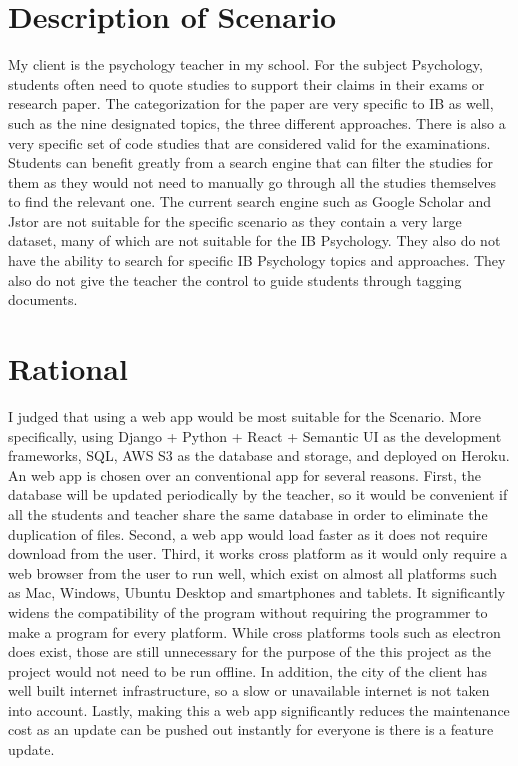 \documentclass[
]{article}
\author{}
\date{}
\begin{document}
\hypertarget{description-of-scenario}{%
\section{Description of Scenario}\label{description-of-scenario}}

My client is the psychology teacher in my school. For the subject
Psychology, students often need to quote studies to support their claims
in their exams or research paper. The categorization for the paper are
very specific to IB as well, such as the nine designated topics, the
three different approaches. There is also a very specific set of code
studies that are considered valid for the examinations. Students can
benefit greatly from a search engine that can filter the studies for
them as they would not need to manually go through all the studies
themselves to find the relevant one. The current search engine such as
Google Scholar and Jstor are not suitable for the specific scenario as
they contain a very large dataset, many of which are not suitable for
the IB Psychology. They also do not have the ability to search for
specific IB Psychology topics and approaches. They also do not give the
teacher the control to guide students through tagging documents.

\hypertarget{rational}{%
\section{Rational}\label{rational}}

I judged that using a web app would be most suitable for the Scenario.
More specifically, using Django + Python + React + Semantic UI as the
development frameworks, SQL, AWS S3 as the database and storage, and
deployed on Heroku. An web app is chosen over an conventional app for
several reasons. First, the database will be updated periodically by the
teacher, so it would be convenient if all the students and teacher share
the same database in order to eliminate the duplication of files.
Second, a web app would load faster as it does not require download from
the user. Third, it works cross platform as it would only require a web
browser from the user to run well, which exist on almost all platforms
such as Mac, Windows, Ubuntu Desktop and smartphones and tablets. It
significantly widens the compatibility of the program without requiring
the programmer to make a program for every platform. While cross
platforms tools such as electron does exist, those are still unnecessary
for the purpose of the this project as the project would not need to be
run offline. In addition, the city of the client has well built internet
infrastructure, so a slow or unavailable internet is not taken into
account. Lastly, making this a web app significantly reduces the
maintenance cost as an update can be pushed out instantly for everyone
is there is a feature update.
\end{document}
